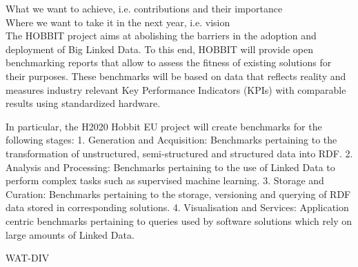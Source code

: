 \documentclass{llncs}
\begin{document}
        What we want to achieve, i.e. contributions and their importance \\
        Where we want to take it in the next year, i.e. vision  \\
        
        
        The HOBBIT project aims at abolishing the barriers in the adoption and deployment of Big Linked Data. To this end, HOBBIT will provide open benchmarking reports that allow to assess the fitness of existing solutions for their purposes. These benchmarks will be based on data that reflects reality and measures industry relevant Key Performance Indicators (KPIs) with comparable results using standardized hardware.
        
        In particular, the H2020 Hobbit EU project will create benchmarks for the following stages: 1. Generation and Acquisition: Benchmarks pertaining to the transformation of unstructured, semi-structured and structured data into RDF. 2. Analysis and Processing: Benchmarks pertaining to the use of Linked Data to perform complex tasks such as supervised machine learning. 3. Storage and Curation: Benchmarks pertaining to the storage, versioning and querying of RDF data stored in corresponding solutions. 4. Visualisation and Services: Application centric benchmarks pertaining to queries used by software solutions which rely on large amounts of Linked Data.

    
        
            \item WAT-DIV
    
        
\end{document}

